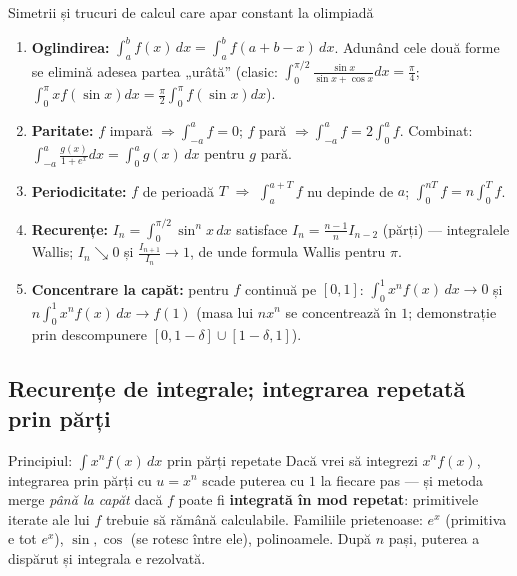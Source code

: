 \begin{tehbox}{Simetrii și trucuri de calcul care apar constant la olimpiadă}
\begin{enumerate}[leftmargin=*, itemsep=1pt]
\item \textbf{Oglindirea:} $\displaystyle\int_a^b f(x)\,dx=\int_a^b f(a+b-x)\,dx$. Adunând cele două forme se elimină adesea partea „urâtă'' (clasic: $\int_0^{\pi/2}\frac{\sin x}{\sin x+\cos x}dx=\frac\pi4$; $\int_0^{\pi}xf(\sin x)dx=\frac{\pi}{2}\int_0^\pi f(\sin x)dx$).
\item \textbf{Paritate:} $f$ impară $\Rightarrow\int_{-a}^a f=0$; $f$ pară $\Rightarrow\int_{-a}^a f=2\int_0^a f$. Combinat: $\int_{-a}^{a}\frac{g(x)}{1+e^{x}}dx=\int_0^a g(x)\,dx$ pentru $g$ pară.
\item \textbf{Periodicitate:} $f$ de perioadă $T$ $\Rightarrow$ $\int_a^{a+T}f$ nu depinde de $a$; $\int_0^{nT}f=n\int_0^T f$.
\item \textbf{Recurențe:} $I_n=\int_0^{\pi/2}\sin^n x\,dx$ satisface $I_n=\frac{n-1}{n}I_{n-2}$ (părți) --- integralele Wallis; $I_n\searrow 0$ și $\frac{I_{n+1}}{I_n}\to1$, de unde formula Wallis pentru $\pi$.
\item \textbf{Concentrare la capăt:} pentru $f$ continuă pe $[0,1]$: $\int_0^1 x^n f(x)\,dx\to0$ și $n\!\int_0^1 x^n f(x)\,dx\to f(1)$ (masa lui $nx^n$ se concentrează în $1$; demonstrație prin descompunere $[0,1-\delta]\cup[1-\delta,1]$).
\end{enumerate}
\end{tehbox}

\subsection{Recurențe de integrale; integrarea repetată prin părți}

\begin{tehbox}{Principiul: $\int x^n f(x)\,dx$ prin părți repetate}
Dacă vrei să integrezi $x^n f(x)$, integrarea prin părți cu $u=x^n$ scade puterea cu $1$ la fiecare pas --- și metoda merge \emph{până la capăt} dacă $f$ poate fi \textbf{integrată în mod repetat}: primitivele iterate ale lui $f$ trebuie să rămână calculabile. Familiile prietenoase: $e^{x}$ (primitiva e tot $e^x$), $\sin,\cos$ (se rotesc între ele), polinoamele. După $n$ pași, puterea a dispărut și integrala e rezolvată.
\end{tehbox}

